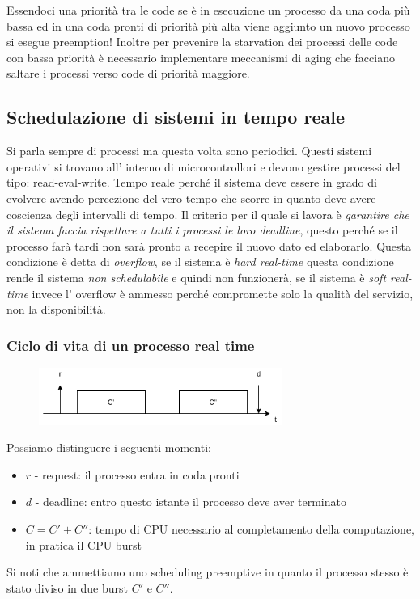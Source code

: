 Essendoci una priorità tra le code se è in esecuzione un processo da una coda più bassa ed in una coda pronti di priorità più alta viene aggiunto un nuovo processo si esegue preemption!
Inoltre per prevenire la starvation dei processi delle code con bassa priorità è necessario implementare meccanismi di aging che facciano saltare i processi verso code di priorità maggiore.

\subsection{Schedulazione di sistemi in tempo reale}
Si parla sempre di processi ma questa volta sono periodici.
Questi sistemi operativi si trovano all' interno di microcontrollori e devono gestire processi del tipo: read-eval-write.
Tempo reale perché il sistema deve essere in grado di evolvere avendo percezione del vero tempo che scorre in quanto deve avere coscienza degli intervalli di tempo.
Il criterio per il quale si lavora è \emph{garantire che il sistema faccia rispettare a tutti i processi le loro deadline}, questo perché se il processo farà tardi non sarà pronto a recepire il nuovo dato ed elaborarlo.
Questa condizione è detta di \emph{overflow}, se il sistema è \emph{hard real-time} questa condizione rende il sistema \emph{non schedulabile} e quindi non funzionerà, se il sistema è \emph{soft real-time} invece l' overflow è ammesso perché compromette solo la qualità del servizio, non la disponibilità.

\subsubsection{Ciclo di vita di un processo real time}
\begin{figure}[H]
    \centering
    \includegraphics[width=300px]{images/4_Scheduling/processo_real_time.png}
\end{figure}
Possiamo distinguere i seguenti momenti:
\begin{itemize}
    \item $r$ - request: il processo entra in coda pronti
    \item $d$ - deadline: entro questo istante il processo deve aver terminato
    \item $C = C' + C''$: tempo di CPU necessario al completamento della computazione, in pratica il CPU burst
\end{itemize}
Si noti che ammettiamo uno scheduling preemptive in quanto il processo stesso è stato diviso in due burst $C'$ e $C''$.

